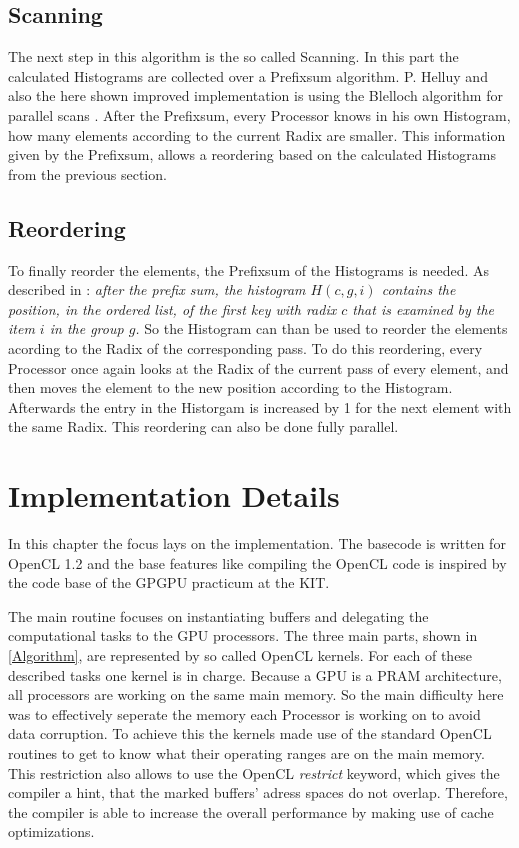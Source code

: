 \documentclass{llncs}
\begin{document}
\subsection{Scanning}
The next step in this algorithm is the so called Scanning. In this part the calculated Histograms are collected over a Prefixsum algorithm. P. Helluy \cite{ocl-radix-helluy} and also the here shown improved implementation is using the Blelloch algorithm for parallel scans \cite{blelloch1989scans}. After the Prefixsum, every Processor knows in his own Histogram, how many elements according to the current Radix are smaller. This information given by the Prefixsum, allows a reordering based on the calculated Histograms from the previous section.

\subsection{Reordering}
To finally reorder the elements, the Prefixsum of the Histograms is needed. As described in \cite{ocl-radix-helluy}: \textit{after the prefix sum, the histogram $H(c, g, i)$ contains the position, in the ordered list, of the first key with radix $c$ that is examined by the item $i$ in the group $g$.} So the Histogram can than be used to reorder the elements acording to the Radix of the corresponding pass. To do this reordering, every Processor once again looks at the Radix of the current pass of every element, and then moves the element to the new position according to the Histogram. Afterwards the entry in the Historgam is increased by 1 for the next element with the same Radix. This reordering can also be done fully parallel.

\newpage
\section{Implementation Details}
In this chapter the focus lays on the implementation. The basecode is written for OpenCL 1.2 and the base features like compiling the OpenCL code is inspired by the code base of the GPGPU practicum at the KIT.

The main routine focuses on instantiating buffers and delegating the computational tasks to the GPU processors. The three main parts, shown in \ref{Algorithm}, are represented by so called OpenCL kernels. For each of these described tasks one kernel is in charge. Because a GPU is a PRAM architecture, all processors are working on the same main memory. So the main difficulty here was to effectively seperate the memory each Processor is working on to avoid data corruption. To achieve this the kernels made use of the standard OpenCL routines to get to know what their operating ranges are on the main memory. This restriction also allows to use the OpenCL \textit{restrict} keyword, which gives the compiler a hint, that the marked buffers' adress spaces do not overlap. Therefore, the compiler is able to increase the overall performance by making use of cache optimizations.
\end{document}
